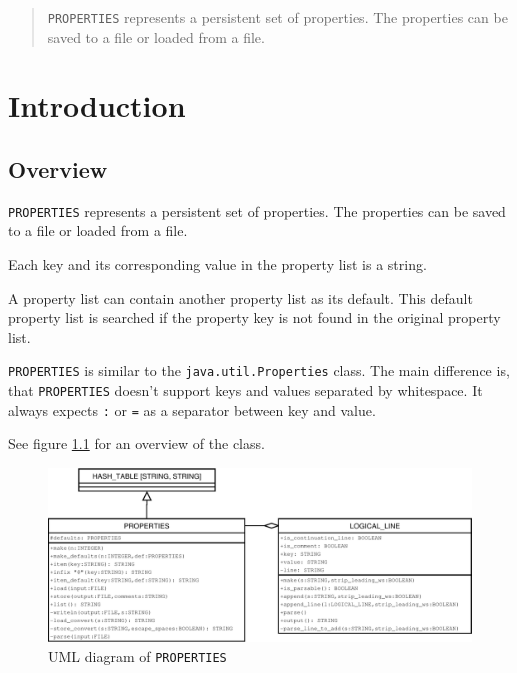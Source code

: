 \documentclass[a4paper,fleqn]{report}
\begin{document}
\begin{abstract}
  \texttt{PROPERTIES} represents a persistent set of properties. The
  properties can be saved to a file or loaded from a file.
\end{abstract}

\clearpage
\tableofcontents

\clearpage
\listoffigures

\chapter{Introduction}
\label{cha:introduction}


\setcounter{page}{0} 



\section{Overview}
\label{sec:overview}

\texttt{PROPERTIES} represents a persistent set of properties. The
properties can be saved to a file or loaded from a file.

Each key and its corresponding value in the property list is a string.

A property list can contain another property list as its default. This
default property list is searched if the property key is not found in
the original property list.

\texttt{PROPERTIES} is similar to the \texttt{java.util.Properties}
class. The main difference is, that \texttt{PROPERTIES} doesn't
support keys and values separated by whitespace. It always expects
\texttt{:} or \texttt{=} as a separator between key and value.

See figure \ref{fig:uml-diagram} for an overview of the class.

\begin{figure}[htbp]
  \centering
  \includegraphics[width=\textwidth]{./figures/uml}
  \caption{UML diagram of \texttt{PROPERTIES}}
  \label{fig:uml-diagram}
\end{figure}
\end{document}
